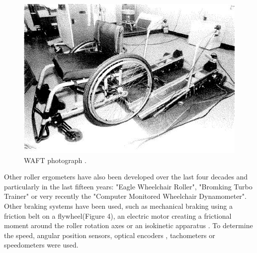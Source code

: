 \begin{figure}[h]
\center
\includegraphics[scale = 25]{images/WAFT}
\caption{WAFT photograph \cite{langbein1993research}.}
\label{WAFT}
\end{figure}


Other roller ergometers have also been developed over the last four decades and particularly in the last fifteen years: "Eagle Wheelchair Roller"\cite{kerk1995effect}, "Bromking Turbo Trainer" \cite{goosey2001kinetic} \cite{goosey2001kinetic, price1999thermoregulatory} or very recently the "Computer Monitored Wheelchair Dynamometer"\cite{cooper2003wheelchair, digiovine2001dynamic}.  Other braking systems have been used, such as mechanical braking using a friction belt on a flywheel\cite{goosey1998relationship, kulig2001effect, rodgers1994biomechanics}(Figure 4), an electric motor creating a frictional moment around the roller rotation axes \cite{coutts1987aerobic, kerk1995effect, patterson1997selected, vanlandewijck1999field} or an isokinetic apparatus \cite{ruggles1994biomechanics}. To determine the speed, angular position sensors\cite{brouha1967continuous, coutts1987aerobic, coutts1990kinematics, patterson1997selected, rodgers1994biomechanics}, optical encoders \cite{devillard1999wheelchair, devillard2001validation, langbein1993calibration, langbein1994initial, newsam1996temporal, theisen1996new}, tachometers \cite{cooper1990exploratory, kerk1995effect, masse1992biomechanical, vanlandewijck1999field} or speedometers \cite{goosey1998relationship, rodgers1994biomechanics} were used.

